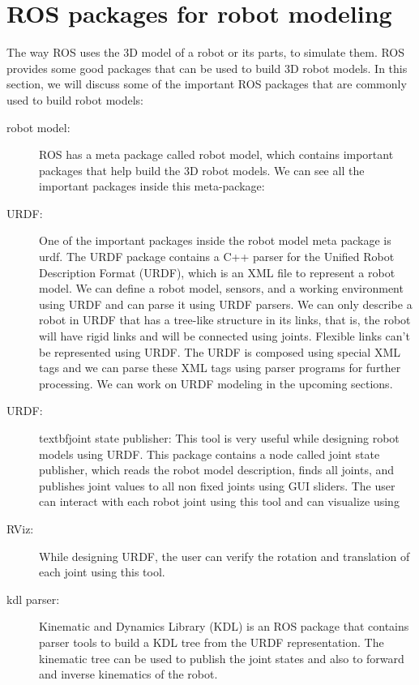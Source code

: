 \section{ROS packages for robot modeling}
The way ROS uses the 3D model of a robot or its parts, to simulate them. ROS provides some good packages that can be used to build 3D robot models. In this section, we will discuss some of the important ROS packages that are commonly used to build robot models:
\begin{description}
    \item [{robot model}:] ROS has a meta package called robot model, which contains important 
    packages that help build the 3D robot models. We can see all the important packages inside this meta-package:

\item [{URDF}:]  One of the important packages inside the robot model meta package is urdf. The 
URDF package contains a C++ parser for the Unified Robot Description Format (URDF),
which is an XML file to represent a robot model. We can define a robot model, sensors, and a working environment using URDF and can parse it using URDF parsers. We can only describe a robot in URDF that has a tree-like structure in its links, that is, the robot will have rigid links and will be connected 
using joints. Flexible links can't be represented using URDF. The URDF is composed using special XML tags and we can parse these XML tags using 
parser programs for further processing. We can work on URDF modeling in the upcoming 
sections.

\item [{URDF}:]
textbf{joint state publisher}: This tool is very useful while designing robot 
models using URDF.
This package contains a node called joint state publisher, which reads the robot 
model description, finds all joints, and publishes joint values to all non fixed 
joints using GUI sliders. The user can interact with each robot joint using this tool and can visualize using 

\item [{RViz}:]
While designing URDF, the user can verify the rotation and translation of each 
joint using this tool. 

\item [{kdl parser}:]
Kinematic and Dynamics Library (KDL) is an ROS package that 
contains parser tools to build a KDL tree from the URDF representation. The kinematic 
tree can be used to publish the joint states and also to forward and inverse 
kinematics of the robot.


\end{description}
